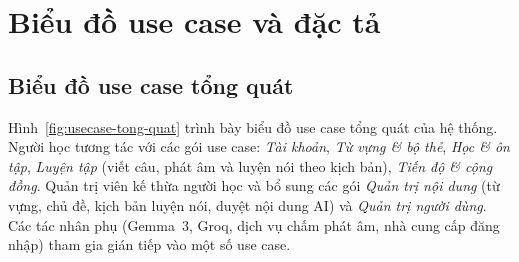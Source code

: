 \section{Biểu đồ use case và đặc tả}
\label{sec:use-case}

\subsection{Biểu đồ use case tổng quát}
\label{subsec:usecase-tong-quat}

Hình~\ref{fig:usecase-tong-quat} trình bày biểu đồ use case tổng quát của
hệ thống. Người học tương tác với các gói use case: \textit{Tài khoản},
\textit{Từ vựng \& bộ thẻ}, \textit{Học \& ôn tập}, \textit{Luyện tập}
(viết câu, phát âm và luyện nói theo kịch bản), \textit{Tiến độ \& cộng
đồng}. Quản trị viên kế thừa người học và bổ sung các gói \textit{Quản trị
nội dung} (từ vựng, chủ đề, kịch bản luyện nói, duyệt nội dung AI) và
\textit{Quản trị người dùng}. Các tác nhân phụ (Gemma~3, Groq, dịch vụ chấm
phát âm, nhà cung cấp đăng nhập) tham gia gián tiếp vào một số use case.


